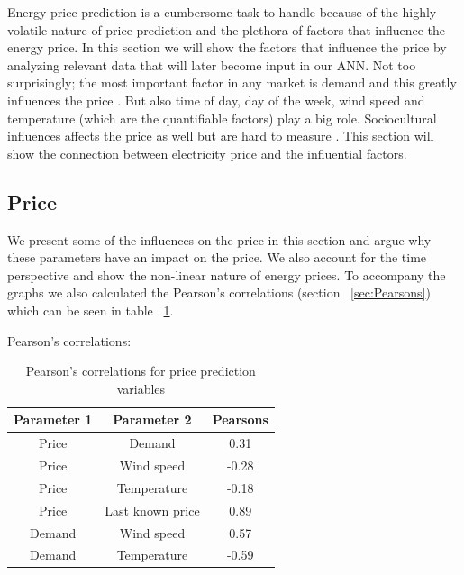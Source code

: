 Energy price prediction is a cumbersome task to handle because of the highly volatile nature of price prediction \cite{pjmForecast} \cite{yamin2004adaptive} and the plethora of factors that influence the energy price\cite{singhal2011electricity}. In this section we will show the factors that influence the price by analyzing relevant data that will later become input in our ANN. Not too surprisingly; the most important factor in any market is demand and this greatly influences the price \cite{supplyAndDemand}. But also time of day, day of the week, wind speed and temperature (which are the quantifiable factors) play a big role. Sociocultural influences affects the price as well but are hard to measure \cite{singhal2011electricity}. This section will show the connection between electricity price and the influential factors.

\subsection{Price}\label{sec:Price}
We present some of the influences on the price in this section and argue why these parameters have an impact on the price. We also account for the time perspective and show the non-linear nature of energy prices. To accompany the graphs we also calculated the Pearson's correlations (section ~\ref{sec:Pearsons}) which can be seen in table ~\ref{table:pearsonsPriceVariables}.

Pearson's correlations:
\begin{table}[H]
\centering  %
\begin{tabular}{|c|c|c|} %
 \hline
 Parameter 1 & Parameter 2 & Pearsons \\ [0.5ex] %
\hline                  %
Price & Demand & 0.31 \\ \hline
Price & Wind speed & -0.28  \\ \hline
Price & Temperature & -0.18 \\ \hline
Price & Last known price & 0.89 \\ \hline
Demand & Wind speed & 0.57 \\ \hline
Demand & Temperature & -0.59 \\ \hline
\end{tabular}
\caption{Pearson's correlations for price prediction variables} %
\label{table:pearsonsPriceVariables} %
\end{table}

